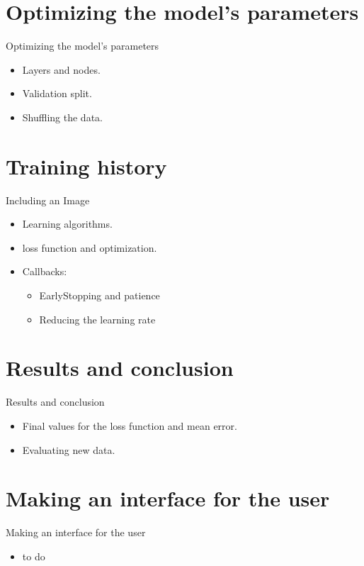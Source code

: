 \documentclass{beamer}
\begin{document}
\section{Optimizing the model's parameters}
\begin{frame}{Optimizing the model's parameters}
	\begin{itemize}
		\item Layers and nodes.
		\item Validation split.
		\item Shuffling the data.
	\end{itemize}
\end{frame}

\section{Training history}
\begin{frame}{Including an Image}
    \begin{itemize}
        \item Learning algorithms.
        \item loss function and optimization.
        \item Callbacks:
	\begin{itemize}
		\item EarlyStopping and patience
		\item Reducing the learning rate
	\end{itemize}
    \end{itemize}
\end{frame}

\section{Results and conclusion}
\begin{frame}{Results and conclusion}
    \begin{itemize}
		\item Final values for the loss function and mean error.
		\item Evaluating new data.
    \end{itemize}
\end{frame}

\section*{Making an interface for the user}
\begin{frame}{Making an interface for the user}
    \begin{itemize}
		\item to do
    \end{itemize}
\end{frame}
\end{document}
